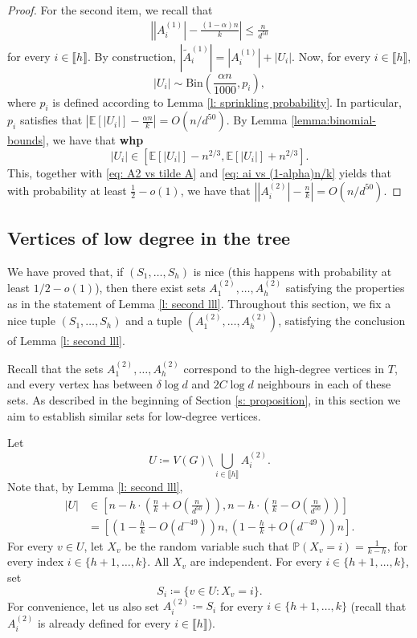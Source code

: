 \documentclass[notitlepage]{scrartcl}
\newcommand{\br}[1]{\llbracket{#1}\rrbracket}
\begin{document}
\begin{proof}
For the second item, we recall that 
\begin{align}
    \left||A_i^{(1)}|-\frac{(1-\alpha)n}{k}\right|\le \frac{n}{d^{50}} \label{eq: ai vs (1-alpha)n/k}    
\end{align}
for every $i\in \br{h}$. By construction, $|\tilde{A}_i^{(1)}|=|A_i^{(1)}|+|U_i|$. Now, for every $i\in \br{h}$, $$|U_i|\sim \text{Bin}\left(\frac{\alpha n}{1000},p_i\right),$$ where $p_i$ is defined according to Lemma \ref{l: sprinkling probability}. In particular, $p_i$ satisfies that $\left|\mathbb{E}[|U_i|]-\frac{\alpha n}{k}\right|=O(n/d^{50})$. By Lemma \ref{lemma:binomial-bounds}, we have that \textbf{whp} $$|U_i|\in \left[\mathbb{E}[|U_i|]-n^{2/3},\mathbb{E}[|U_i|]+n^{2/3}\right].$$ 
This, together with \eqref{eq: A2 vs tilde A} and \eqref{eq: ai vs (1-alpha)n/k} yields that with probability at least $\frac{1}{2}-o(1)$, we have that $\left||A_i^{(2)}| - \frac{n}{k}\right| = O\left(n/d^{50}\right)$. 
\end{proof}

\subsection{Vertices of low degree in the tree}\label{s: low degree}

We have proved that, if $(S_1,\ldots,S_h)$ is nice (this happens with probability at least $1/2-o(1)$), then there exist sets $A_1^{(2)},\ldots, A_h^{(2)}$ satisfying the properties as in the statement of Lemma \ref{l: second lll}.
Throughout this section, we fix a nice tuple $(S_1,\ldots,S_h)$ and a tuple $(A_1^{(2)},\ldots,A_h^{(2)})$, satisfying the conclusion of Lemma \ref{l: second lll}.




Recall that the sets $A_1^{(2)},\ldots, A_h^{(2)}$ correspond to the high-degree vertices in $T$, and every vertex has between $\delta\log d$ and $2C\log d$ neighbours in each of these sets. As described in the beginning of Section \ref{s: proposition}, in this section we aim to establish similar sets for low-degree vertices.

Let 
\begin{equation}
    U\coloneqq V(G)\setminus \bigcup_{i \in \br{h}} A_i^{(2)}.
    \label{eq:U-def}
\end{equation}
    Note that, by Lemma \ref{l: second lll},
\begin{align}
  |U|&\in \left[n-h\cdot\left(\frac{n}{k}+O\left(\frac{n}{d^{50}}\right)\right), n-h\cdot\left(\frac{n}{k}-O\left(\frac{n}{d^{50}}\right)\right)\right]\nonumber\\
  &=\left[\left(1-\frac{h}{k}-O(d^{-49})\right)n, \left(1-\frac{h}{k}+O(d^{-49})\right)n\right]. \label{eq: size y}
\end{align}
For every $v \in U$, let $X_v$ be the random variable such that $\mathbb{P}\left(X_v=i\right)=\frac{1}{k-h}$, for every index $i\in\{h+1,\ldots,k\}$. All $X_v$ are independent. For every $i\in\{h+1,\ldots,k\}$, set 
\[
    S_i \coloneqq \{v \in U \colon X_v = i\}.
\]
For convenience, let us also set $A_i^{(2)}\coloneqq S_i$ for every $i\in \{h+1,\ldots,k\}$ (recall that $A_i^{(2)}$ is already defined for every $i\in \br{h}$).
\end{document}
